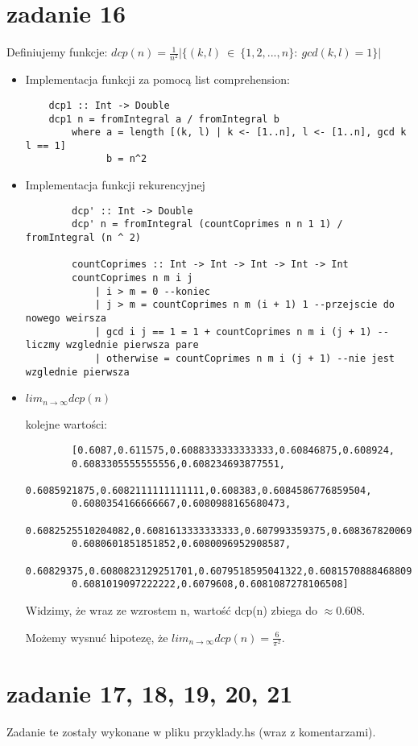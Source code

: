 \documentclass[11pt,a4paper]{article}
\begin{document}
\section*{zadanie 16}
Definiujemy funkcje: $dcp(n) = \frac{1}{n^2} |\{(k, l)\ \in\ \{1, 2, ..., n\}:\ gcd(k, l) = 1\}|$
\begin{itemize}
    \item Implementacja funkcji za pomocą list comprehension: \par
    \begin{verbatim}
    dcp1 :: Int -> Double
    dcp1 n = fromIntegral a / fromIntegral b
        where a = length [(k, l) | k <- [1..n], l <- [1..n], gcd k l == 1]
              b = n^2
    \end{verbatim}

    \item Implementacja funkcji rekurencyjnej
    \begin{verbatim}
        dcp' :: Int -> Double
        dcp' n = fromIntegral (countCoprimes n n 1 1) / fromIntegral (n ^ 2)
        
        countCoprimes :: Int -> Int -> Int -> Int -> Int
        countCoprimes n m i j
            | i > m = 0 --koniec
            | j > m = countCoprimes n m (i + 1) 1 --przejscie do nowego weirsza
            | gcd i j == 1 = 1 + countCoprimes n m i (j + 1) --liczmy wzglednie pierwsza pare
            | otherwise = countCoprimes n m i (j + 1) --nie jest wzglednie pierwsza
    \end{verbatim}

    \item $lim_{n \to \infty} dcp(n)$ \par
    kolejne wartości: \par
    \begin{verbatim}
        [0.6087,0.611575,0.6088333333333333,0.60846875,0.608924,
        0.6083305555555556,0.608234693877551,
        0.6085921875,0.6082111111111111,0.608383,0.6084586776859504,
        0.6080354166666667,0.6080988165680473,
        0.6082525510204082,0.6081613333333333,0.607993359375,0.6083678200692042,
        0.6080601851851852,0.6080096952908587,
        0.60829375,0.6080823129251701,0.6079518595041322,0.6081570888468809,
        0.6081019097222222,0.6079608,0.6081087278106508]
    \end{verbatim}
    Widzimy, że wraz ze wzrostem n, wartość dcp(n) zbiega do $\approx 0.608$. \par
    Możemy wysnuć hipotezę, że $lim_{n \to \infty} dcp(n) = \frac{6}{\pi^2}$.
\end{itemize}

\bigskip
\section*{zadanie 17, 18, 19, 20, 21}
Zadanie te zostały wykonane w pliku przyklady.hs (wraz z komentarzami).
\end{document}
